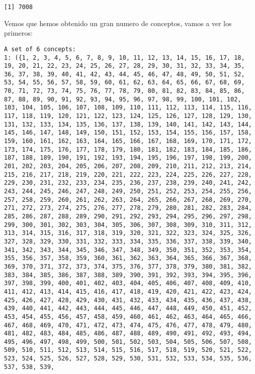 \documentclass[
  letterpaper,
  DIV=11,
  numbers=noendperiod]{scrreprt}
\newenvironment{Shaded}{\begin{snugshade}}{\end{snugshade}}
\newcommand{\FunctionTok}[1]{\textcolor[rgb]{0.28,0.35,0.67}{#1}}
\newcommand{\NormalTok}[1]{\textcolor[rgb]{0.00,0.23,0.31}{#1}}
\newcommand{\SpecialCharTok}[1]{\textcolor[rgb]{0.37,0.37,0.37}{#1}}
\begin{document}
\begin{verbatim}
[1] 7008
\end{verbatim}

Vemos que hemos obtenido un gran numero de conceptos, vamos a ver los
primeros:

\begin{Shaded}
\end{Shaded}

\begin{verbatim}
A set of 6 concepts:
1: ({1, 2, 3, 4, 5, 6, 7, 8, 9, 10, 11, 12, 13, 14, 15, 16, 17, 18, 19, 20, 21, 22, 23, 24, 25, 26, 27, 28, 29, 30, 31, 32, 33, 34, 35, 36, 37, 38, 39, 40, 41, 42, 43, 44, 45, 46, 47, 48, 49, 50, 51, 52, 53, 54, 55, 56, 57, 58, 59, 60, 61, 62, 63, 64, 65, 66, 67, 68, 69, 70, 71, 72, 73, 74, 75, 76, 77, 78, 79, 80, 81, 82, 83, 84, 85, 86, 87, 88, 89, 90, 91, 92, 93, 94, 95, 96, 97, 98, 99, 100, 101, 102, 103, 104, 105, 106, 107, 108, 109, 110, 111, 112, 113, 114, 115, 116, 117, 118, 119, 120, 121, 122, 123, 124, 125, 126, 127, 128, 129, 130, 131, 132, 133, 134, 135, 136, 137, 138, 139, 140, 141, 142, 143, 144, 145, 146, 147, 148, 149, 150, 151, 152, 153, 154, 155, 156, 157, 158, 159, 160, 161, 162, 163, 164, 165, 166, 167, 168, 169, 170, 171, 172, 173, 174, 175, 176, 177, 178, 179, 180, 181, 182, 183, 184, 185, 186, 187, 188, 189, 190, 191, 192, 193, 194, 195, 196, 197, 198, 199, 200, 201, 202, 203, 204, 205, 206, 207, 208, 209, 210, 211, 212, 213, 214, 215, 216, 217, 218, 219, 220, 221, 222, 223, 224, 225, 226, 227, 228, 229, 230, 231, 232, 233, 234, 235, 236, 237, 238, 239, 240, 241, 242, 243, 244, 245, 246, 247, 248, 249, 250, 251, 252, 253, 254, 255, 256, 257, 258, 259, 260, 261, 262, 263, 264, 265, 266, 267, 268, 269, 270, 271, 272, 273, 274, 275, 276, 277, 278, 279, 280, 281, 282, 283, 284, 285, 286, 287, 288, 289, 290, 291, 292, 293, 294, 295, 296, 297, 298, 299, 300, 301, 302, 303, 304, 305, 306, 307, 308, 309, 310, 311, 312, 313, 314, 315, 316, 317, 318, 319, 320, 321, 322, 323, 324, 325, 326, 327, 328, 329, 330, 331, 332, 333, 334, 335, 336, 337, 338, 339, 340, 341, 342, 343, 344, 345, 346, 347, 348, 349, 350, 351, 352, 353, 354, 355, 356, 357, 358, 359, 360, 361, 362, 363, 364, 365, 366, 367, 368, 369, 370, 371, 372, 373, 374, 375, 376, 377, 378, 379, 380, 381, 382, 383, 384, 385, 386, 387, 388, 389, 390, 391, 392, 393, 394, 395, 396, 397, 398, 399, 400, 401, 402, 403, 404, 405, 406, 407, 408, 409, 410, 411, 412, 413, 414, 415, 416, 417, 418, 419, 420, 421, 422, 423, 424, 425, 426, 427, 428, 429, 430, 431, 432, 433, 434, 435, 436, 437, 438, 439, 440, 441, 442, 443, 444, 445, 446, 447, 448, 449, 450, 451, 452, 453, 454, 455, 456, 457, 458, 459, 460, 461, 462, 463, 464, 465, 466, 467, 468, 469, 470, 471, 472, 473, 474, 475, 476, 477, 478, 479, 480, 481, 482, 483, 484, 485, 486, 487, 488, 489, 490, 491, 492, 493, 494, 495, 496, 497, 498, 499, 500, 501, 502, 503, 504, 505, 506, 507, 508, 509, 510, 511, 512, 513, 514, 515, 516, 517, 518, 519, 520, 521, 522, 523, 524, 525, 526, 527, 528, 529, 530, 531, 532, 533, 534, 535, 536, 537, 538, 539, 
\end{verbatim}
\end{document}
